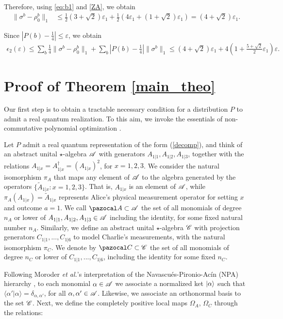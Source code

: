 \documentclass[onecolumn,prx,amsmath,amssymb]{revtex4-2}
\def\braket#1#2{\langle#1|#2\rangle}
\def\A{{\pazocal A}}
\def\C{{\pazocal C}}
\def\norm#1{\| #1 \| }
\def\abs#1{|#1|}
\begin{document}
\begin{appendix}
\noindent Therefore, using \eqref{eq:b1} and \eqref{ZA}, we obtain
\begin{align*}
\norm{\sigma^{b}-\rho_0^{b}}_1 &\leq 
 \frac{1}{2}(3+\sqrt{2})\varepsilon_1+\frac{1}{2}(4\varepsilon_1 + (1+\sqrt{2})\varepsilon_1) = (4+\sqrt{2})\varepsilon_1 .
\end{align*}

\noindent Since $\abs{P(b)-\frac{1}{4}} \leq \varepsilon$, we obtain 
\begin{align}
\epsilon_2(\varepsilon) \leq \sum_b \frac{1}{4} \norm{\sigma^b-\rho_0^b}_1 + \sum_b \abs{P(b)-\frac{1}{4}} \norm{ \sigma^b }_1\leq (4+\sqrt{2})\varepsilon_1 + 4 \left( 1 + \frac{5+\sqrt{2}}{2}\varepsilon_1\right) \varepsilon.
\end{align}

\section{Proof of Theorem \ref{main_theo}}
\label{numerics}

 
Our first step is to obtain a tractable necessary condition for a distribution $P$ to admit a real quantum realization. To this aim, we invoke the essentials of non-commutative polynomial optimization \cite{NOP}.

Let $P$ admit a real quantum representation of the form (\ref{decomp}), and think of an abstract unital $\star$-algebra ${\cal A}$ with generators $A_{1|1},A_{1|2},A_{1|3}$, together with the relations $A_{1|x}=A_{1|x}^\dagger=(A_{1|x})^2$, for $x=1,2,3$. We consider the natural isomorphism $\pi_A$ that maps any element of ${\cal A}$ to the algebra generated by the operators $\{\tilde{A}_{1|x}:x=1,2,3\}$. That is, $A_{1|x}$ is an element of ${\cal A}$, while $\pi_A(A_{1|x})=\tilde{A}_{1|x}$ represents Alice's physical measurement operator for setting $x$ and outcome $a=1$. We call $\A\subset {\cal A}$ the set of all monomials of degree $n_A$ or lower of $A_{1|1},A_{1|2},A_{1|3}\in {\cal A}$ including the identity, for some fixed natural number $n_A$. Similarly, we define an abstract unital $\star$-algebra ${\cal C}$ with projection generators $C_{1|1},...,C_{1|6}$ to model Charlie's measurements, with the natural isomorphism $\pi_C$. We denote by $\C\subset{\cal C}$ the set of all monomials of degree $n_C$ or lower of $C_{1|1},...,C_{1|6}$, including the identity for some fixed $n_C$.


Following Moroder \emph{et al.}'s interpretation \cite{moroder} of the Navascu\'es-Pironio-Ac\'in (NPA) hierarchy \cite{npa, npa2}, to each monomial $\alpha\in {\cal A}$ we associate a normalized ket $|\alpha\rangle$ such that $\braket{\alpha'}{\alpha}=\delta_{\alpha,\alpha'}$, for all $\alpha,\alpha'\in{\cal A}$. Likewise, we associate an orthonormal basis to the set ${\cal C}$. Next, we define the completely positive local maps $\Omega_A$, $\Omega_C$ through the relations:


\end{appendix}
\end{document}
